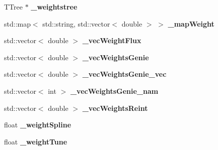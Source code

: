 \begin{DoxyCompactItemize}
\item 
T\+Tree $\ast$ {\bfseries \+\_\+weightstree}\hypertarget{classanalysis_1_1EventWeightTree_a007ac1f04819cff64bb54b6206966408}{}\label{classanalysis_1_1EventWeightTree_a007ac1f04819cff64bb54b6206966408}

\item 
std\+::map$<$ std\+::string, std\+::vector$<$ double $>$ $>$ {\bfseries \+\_\+map\+Weight}\hypertarget{classanalysis_1_1EventWeightTree_aef493db93e72288ef19cd155052fbce6}{}\label{classanalysis_1_1EventWeightTree_aef493db93e72288ef19cd155052fbce6}

\item 
std\+::vector$<$ double $>$ {\bfseries \+\_\+vec\+Weight\+Flux}\hypertarget{classanalysis_1_1EventWeightTree_a63fcb54ac96617bfa03f1c98bc941d47}{}\label{classanalysis_1_1EventWeightTree_a63fcb54ac96617bfa03f1c98bc941d47}

\item 
std\+::vector$<$ double $>$ {\bfseries \+\_\+vec\+Weights\+Genie}\hypertarget{classanalysis_1_1EventWeightTree_a27f4bcfa903da58796010d056b257f1c}{}\label{classanalysis_1_1EventWeightTree_a27f4bcfa903da58796010d056b257f1c}

\item 
std\+::vector$<$ double $>$ {\bfseries \+\_\+vec\+Weights\+Genie\+\_\+vec}\hypertarget{classanalysis_1_1EventWeightTree_a8a810f60c08a21ee2f6bfd881cf9f016}{}\label{classanalysis_1_1EventWeightTree_a8a810f60c08a21ee2f6bfd881cf9f016}

\item 
std\+::vector$<$ int $>$ {\bfseries \+\_\+vec\+Weights\+Genie\+\_\+nam}\hypertarget{classanalysis_1_1EventWeightTree_a8d2b9d134034c38e6ee22a3497951694}{}\label{classanalysis_1_1EventWeightTree_a8d2b9d134034c38e6ee22a3497951694}

\item 
std\+::vector$<$ double $>$ {\bfseries \+\_\+vec\+Weights\+Reint}\hypertarget{classanalysis_1_1EventWeightTree_a2afa517c5d3c82f395cca60f6bed1e55}{}\label{classanalysis_1_1EventWeightTree_a2afa517c5d3c82f395cca60f6bed1e55}

\item 
float {\bfseries \+\_\+weight\+Spline}\hypertarget{classanalysis_1_1EventWeightTree_a5f616b70e5653cd00a2beda1da0db13f}{}\label{classanalysis_1_1EventWeightTree_a5f616b70e5653cd00a2beda1da0db13f}

\item 
float {\bfseries \+\_\+weight\+Tune}\hypertarget{classanalysis_1_1EventWeightTree_aea3750979c4b1ccbf1c11973c79c6e6f}{}\label{classanalysis_1_1EventWeightTree_aea3750979c4b1ccbf1c11973c79c6e6f}


\end{DoxyCompactItemize}
